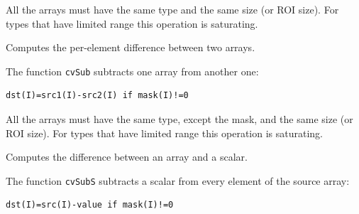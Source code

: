 All the arrays must have the same type and the same size (or ROI size).
For types that have limited range this operation is saturating.


\label{Sub}

Computes the per-element difference between two arrays.


\begin{description}
\end{description}


The function \texttt{cvSub} subtracts one array from another one:

\begin{lstlisting}
dst(I)=src1(I)-src2(I) if mask(I)!=0
\end{lstlisting}

All the arrays must have the same type, except the mask, and the same size (or ROI size).
For types that have limited range this operation is saturating.

\label{SubS}

Computes the difference between an array and a scalar.


\begin{description}
\end{description}

The function \texttt{cvSubS} subtracts a scalar from every element of the source array:

\begin{lstlisting}
dst(I)=src(I)-value if mask(I)!=0
\end{lstlisting}


